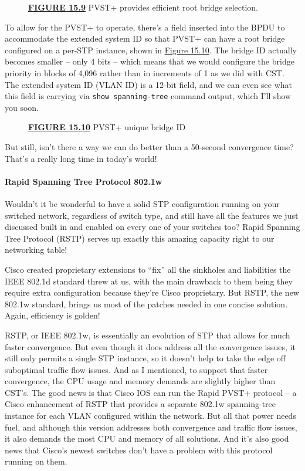 \documentclass[b5paper,11pt]{memoir}
\begin{document}
\begin{figure}
\centering
\caption{{\protect\hyperlink{c15.xhtmlux5cux23figureanchor15-9}{\textbf{FIGURE
15.9}} PVST+ provides efficient root bridge selection.}}
\end{figure}

To allow for the PVST+ to operate, there's a field inserted into the
BPDU to accommodate the extended system ID so that PVST+ can have a root
bridge configured on a per-STP instance, shown in
\protect\hyperlink{c15.xhtmlux5cux23figure15-10}{Figure 15.10}. The
bridge ID actually becomes smaller -- only 4 bits -- which means that we
would configure the bridge priority in blocks of 4,096 rather than in
increments of 1 as we did with CST. The extended system ID (VLAN ID) is
a 12-bit field, and we can even see what this field is carrying via
\texttt{show\ spanning-tree} command output, which I'll show you soon.

\begin{figure}
\centering
\caption{{\protect\hyperlink{c15.xhtmlux5cux23figureanchor15-10}{\textbf{FIGURE
15.10}} PVST+ unique bridge ID}}
\end{figure}

But still, isn't there a way we can do better than a 50-second
convergence time? That's a really long time in today's world!

\paragraph{Rapid Spanning Tree Protocol 802.1w}

Wouldn't it be wonderful to have a solid STP configuration running on
your switched network, regardless of switch type, and still have all the
features we just discussed built
in and enabled on
every one of your switches too? Rapid Spanning Tree Protocol (RSTP)
serves up exactly this amazing capacity right to our networking table!

Cisco created proprietary extensions to ``fix'' all the sinkholes and
liabilities the IEEE 802.1d standard threw at us, with the main drawback
to them being they require extra configuration because they're Cisco
proprietary. But RSTP, the new 802.1w standard, brings us most of the
patches needed in one concise solution. Again, efficiency is golden!

RSTP, or IEEE 802.1w, is essentially an evolution of STP that allows for
much faster convergence. But even though it does address all the
convergence issues, it still only permits a single STP instance, so it
doesn't help to take the edge off suboptimal traffic flow issues. And as
I mentioned, to support that faster convergence, the CPU usage and
memory demands are slightly higher than CST's. The good news is that
Cisco IOS can run the Rapid PVST+ protocol -- a Cisco enhancement of RSTP
that provides a separate 802.1w spanning-tree instance for each VLAN
configured within the network. But all that power needs fuel, and
although this version addresses both convergence and traffic flow
issues, it also demands the most CPU and memory of all solutions. And
it's also good news that Cisco's newest switches don't have a problem
with this protocol running on them.
\end{document}
